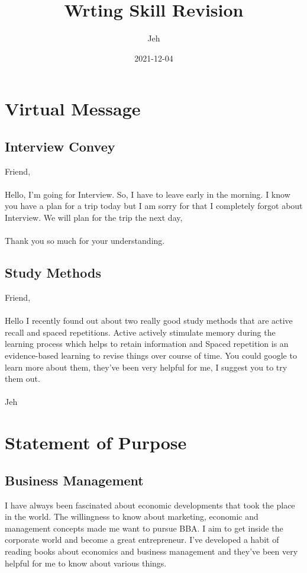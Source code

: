 \documentclass{article}
\title{Wrting Skill Revision}
\date{2021-12-04}
\author{Jeh}
\begin{document}
    \maketitle

    \section{Virtual Message}
    \subsection{Interview Convey}
    Friend,\\\\
    Hello, I'm going for Interview. So,
    I have to leave early in the morning.
    I know you have a plan for a trip today but
    I am sorry for that I completely forgot about
    Interview. We will plan for the trip
    the next day,\\\\
    Thank you so much for your understanding.

    \subsection{Study Methods}
    Friend,\\\\
    Hello I recently found out about two really good
    study methods that are active recall and spaced
    repetitions. Active actively stimulate memory
    during the learning process which helps to retain
    information and Spaced repetition is an evidence-based
    learning to revise things over course of time. You could
    google to learn more about them, they've been very  
    helpful for me, I suggest you to try them out.\\\\
    Jeh

    \newpage
    \section{Statement of Purpose}
    \subsection{Business Management}
    I have always been fascinated about economic developments
    that took the place in the world. The willingness to know
    about marketing, economic and management concepts made me 
    want to pursue BBA. I aim to get inside the corporate world 
    and become a great entrepreneur. I've developed a habit of 
    reading books about economics and business management and 
    they've been very helpful for me to know about various things. 

	
\end{document}
